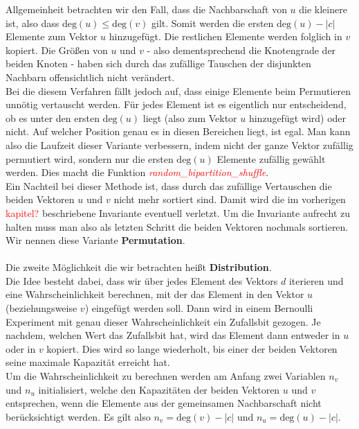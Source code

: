 \documentclass[a4paper]{scrreprt}
\theoremstyle{plain} %
\theoremstyle{definition} %
\begin{document}
Allgemeinheit betrachten wir den Fall, dass die Nachbarschaft von $u$ die kleinere ist, also dass 
$\text{deg}(u) \le \text{deg}(v)$ gilt. Somit werden die ersten $\text{deg}(u)-|c|$ Elemente zum 
Vektor $u$ hinzugefügt. Die restlichen
Elemente werden folglich in $v$ kopiert.
Die Größen von $u$ und $v$ - also dementsprechend die Knotengrade der beiden Knoten - haben sich durch das
zufällige Tauschen der disjunkten Nachbarn offensichtlich
nicht verändert.
\\
Bei die diesem Verfahren fällt  jedoch auf, dass einige Elemente beim Permutieren unnötig vertauscht werden.
Für jedes Element ist es eigentlich nur entscheidend, ob es unter den ersten $\text{deg}(u)$  liegt (also zum Vektor
$u$ hinzugefügt wird) oder nicht. Auf welcher Position genau es in diesen Bereichen liegt, ist egal. Man
kann also die Laufzeit dieser Variante verbessern, indem nicht der ganze Vektor zufällig permutiert 
wird, sondern nur die ersten $\text{deg}(u)$ Elemente zufällig gewählt werden. Dies macht die Funktion 
\textcolor{red}{\textit{random\_bipartition\_shuffle}}.
\\
Ein Nachteil bei dieser Methode ist, dass durch das zufällige Vertauschen die beiden Vektoren
$u$ und $v$ nicht mehr sortiert sind. Damit wird die im vorherigen \textcolor{red}{kapitel?} beschriebene
Invariante eventuell verletzt. Um die Invariante aufrecht zu halten muss man also als letzten Schritt
die beiden Vektoren nochmals sortieren.
Wir nennen diese Variante \textbf{Permutation}.
\\
\\
Die zweite Möglichkeit die wir betrachten heißt \textbf{Distribution}.
\\
Die Idee besteht dabei, dass wir über jedes Element des Vektors $d$ iterieren und eine Wahrscheinlichkeit
berechnen, mit
der das Element in den Vektor $u$ (beziehungsweise $v$) eingefügt werden soll. Dann wird in einem 
Bernoulli Experiment mit genau dieser Wahrscheinlichkeit ein Zufallsbit gezogen. Je nachdem, welchen
Wert das Zufallsbit hat, wird das Element dann entweder in $u$ oder in $v$ kopiert. Dies wird so lange
wiederholt, bis einer der beiden Vektoren seine maximale Kapazität erreicht hat. 
\\
Um die Wahrscheinlichkeit zu berechnen werden am Anfang zwei Variablen $n_v$ und $n_u$ initialisiert, 
welche den Kapazitäten der beiden Vektoren $u$ und $v$ entsprechen, wenn die Elemente aus der 
gemeinsamen Nachbarschaft nicht berücksichtigt werden. Es gilt also $n_v = \text{deg}(v) - |c|$ und
$n_u= \text{deg}(u) - |c|$.
\end{document}
